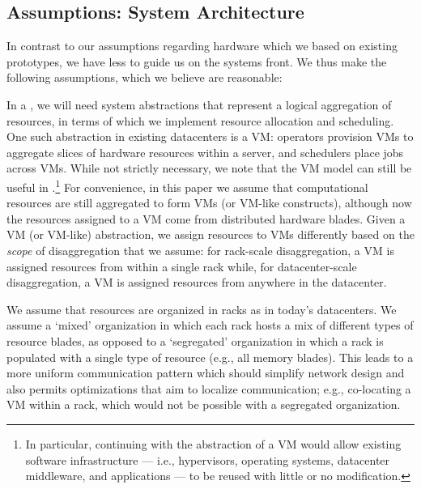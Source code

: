 \vspace{-0.1in}
\subsection{Assumptions: System Architecture}
\vspace{-0.05in}
\label{ssec:system}
In contrast to our assumptions regarding hardware which we based on existing  prototypes, we have less to guide us on the systems front. We thus make the following assumptions, which we believe are reasonable: 

In a \dis, we will need system abstractions that represent a logical aggregation of resources, in terms of which we implement resource allocation and scheduling. 
One such abstraction in existing datacenters is a VM: 
operators provision VMs to aggregate slices of hardware resources within a server, and schedulers place jobs across VMs. 
While not strictly necessary, we note that the VM model can still be useful in \dis.\footnote{In particular, continuing with the abstraction of a VM would allow existing software infrastructure --- i.e., hypervisors, operating systems, datacenter middleware, and applications --- to be reused with little or no modification.} 
For convenience, in this paper we assume that computational resources are still aggregated to form VMs (or VM-like constructs), although now the resources assigned to a VM come from distributed hardware blades. Given a VM (or VM-like) abstraction, we assign resources to VMs differently based on the \emph{scope} of disaggregation that we assume: for rack-scale disaggregation, a VM is assigned resources from within a single rack while, for datacenter-scale disaggregation, a VM is assigned resources from anywhere in the datacenter.

We assume that resources are organized in racks as in today's datacenters. 
We assume a `mixed' organization in which each rack hosts a mix of different types of resource blades, as opposed to a `segregated' organization in which a rack is populated with a single type of resource (e.g., all memory blades). 
This leads to a more uniform communication pattern which should simplify network design and also permits optimizations that aim to localize communication; e.g., co-locating a VM within a rack, which would not be possible with a segregated organization. 

